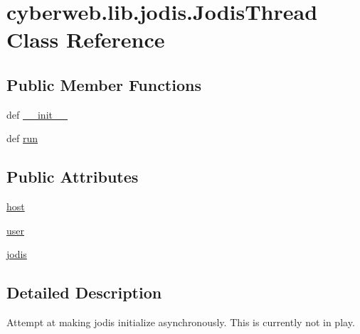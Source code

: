 \hypertarget{classcyberweb_1_1lib_1_1jodis_1_1_jodis_thread}{\section{cyberweb.\-lib.\-jodis.\-Jodis\-Thread \-Class \-Reference}
\label{classcyberweb_1_1lib_1_1jodis_1_1_jodis_thread}
}
\subsection*{\-Public \-Member \-Functions}
\begin{DoxyCompactItemize}
\item 
def \hyperlink{classcyberweb_1_1lib_1_1jodis_1_1_jodis_thread_a2aa10e8e88bd60d7884e7e13247eb571}{\-\_\-\-\_\-init\-\_\-\-\_\-}
\item 
def \hyperlink{classcyberweb_1_1lib_1_1jodis_1_1_jodis_thread_ad754eb7eaceb6983e8537c9aa6a7e19c}{run}
\end{DoxyCompactItemize}
\subsection*{\-Public \-Attributes}
\begin{DoxyCompactItemize}
\item 
\hyperlink{classcyberweb_1_1lib_1_1jodis_1_1_jodis_thread_a838d89dffc85bec19f7cb4b0fe6d9bc1}{host}
\item 
\hyperlink{classcyberweb_1_1lib_1_1jodis_1_1_jodis_thread_aa1acc350504efcaa82bf8700f1bded36}{user}
\item 
\hyperlink{classcyberweb_1_1lib_1_1jodis_1_1_jodis_thread_ab5a21ada4e5eb94bdab9627eb5c6f8a8}{jodis}
\end{DoxyCompactItemize}


\subsection{\-Detailed \-Description}
\begin{DoxyVerb}
Attempt at making jodis initialize asynchronously. This is currently not in play.
\end{DoxyVerb}
 

